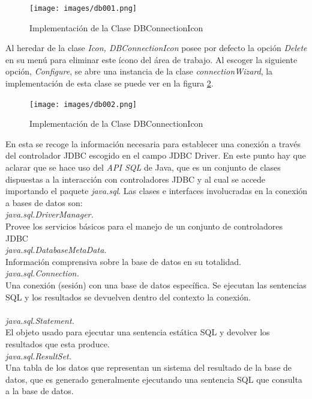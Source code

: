 \begin{figure}[ht]
\centering
\texttt{[image: images/db001.png]}
\caption{Implementaci\'on de la Clase DBConnectionIcon}
\label{db001}
\end{figure}

Al heredar de la clase \textit{Icon, DBConnectionIcon} posee por defecto la opci\'on \textit{Delete} en su men\'u
para eliminar este \'icono del \'area de trabajo.  Al escoger la siguiente opci\'on, \textit{Configure}, se abre
una instancia de la clase \textit{connectionWizard}, la implementaci\'on de esta clase se puede ver en la figura
\ref{db002}.\\

\begin{figure}[ht]
\centering
\texttt{[image: images/db002.png]}
\caption{Implementaci\'on de la Clase DBConnectionIcon}
\label{db002}
\end{figure}

En esta se recoge la informaci\'on necesaria para establecer una conexi\'on a trav\'es del controlador JDBC
escogido en el campo JDBC Driver.  En este punto hay que aclarar que se hace uso del \textit{API SQL} de Java,
que es un conjunto de clases dispuestas a la interacci\'on con controladores JDBC y al cual se accede importando
el paquete \textit{java.sql}.  Las clases e interfaces involucradas en la conexi\'on a bases de datos son:\\

\textit{java.sql.DriverManager.\\}
Provee los servicios b\'asicos para el manejo de un conjunto de controladores JDBC\\

\textit{java.sql.DatabaseMetaData.\\}
Informaci\'on comprensiva sobre la base de datos en su totalidad.\\

\textit{java.sql.Connection.\\}
Una conexi\'on (sesi\'on) con una base de datos espec\'ifica. Se ejecutan las sentencias SQL y los resultados se
devuelven dentro del contexto la conexi\'on.\\ \\

\textit{java.sql.Statement.\\}
El objeto usado para ejecutar una sentencia est\'atica SQL y devolver los resultados que esta produce.\\

\textit{java.sql.ResultSet.\\}
Una tabla de los datos que representan un sistema del resultado de la base de datos, que es generado generalmente
ejecutando una sentencia SQL que consulta a la base de datos.\\

